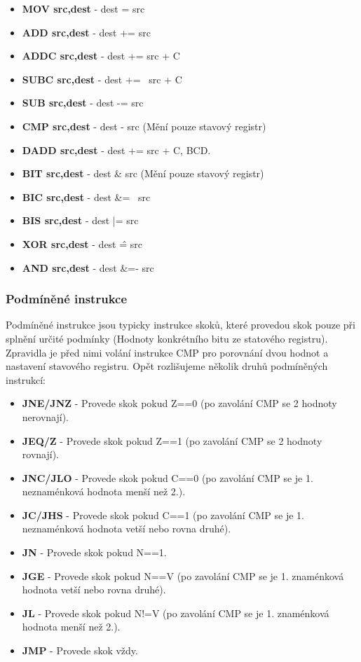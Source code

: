 \begin{itemize}
\item \textbf{MOV src,dest} - dest = src
\item \textbf{ADD src,dest} - dest += src
\item \textbf{ADDC src,dest} - dest += src + C
\item \textbf{SUBC src,dest} - dest += ~src + C
\item \textbf{SUB src,dest} - dest -= src
\item \textbf{CMP src,dest} - dest - src (Mění pouze stavový registr)
\item \textbf{DADD src,dest} - dest += src + C, BCD.
\item \textbf{BIT src,dest} - dest \& src (Mění pouze stavový registr)
\item \textbf{BIC src,dest} - dest \&= ~src
\item \textbf{BIS src,dest} - dest |= src
\item \textbf{XOR src,dest} - dest \^ = src
\item \textbf{AND src,dest} - dest \&=- src
\end{itemize}

\subsubsection{Podmíněné instrukce}

Podmíněné instrukce jsou typicky instrukce skoků, které provedou skok pouze při splnění určité podmínky (Hodnoty konkrétního bitu ze statového registru). Zpravidla je před nimi volání instrukce CMP pro porovnání dvou hodnot a nastavení stavového registru. Opět rozlišujeme několik druhů podmíněných instrukcí:

\begin{itemize}
\item \textbf{JNE/JNZ} - Provede skok pokud Z==0 (po zavolání CMP se 2 hodnoty nerovnají).
\item \textbf{JEQ/Z} - Provede skok pokud Z==1 (po zavolání CMP se 2 hodnoty rovnají).
\item \textbf{JNC/JLO} - Provede skok pokud C==0 (po zavolání CMP se je 1. neznaménková hodnota menší než 2.).
\item \textbf{JC/JHS} - Provede skok pokud C==1 (po zavolání CMP se je 1. neznaménková hodnota vetší nebo rovna druhé).
\item \textbf{JN} - Provede skok pokud N==1.
\item \textbf{JGE} - Provede skok pokud N==V (po zavolání CMP se je 1. znaménková hodnota vetší nebo rovna druhé).
\item \textbf{JL} - Provede skok pokud N!=V (po zavolání CMP se je 1. znaménková hodnota menší než 2.).
\item \textbf{JMP} - Provede skok vždy.
\end{itemize}

